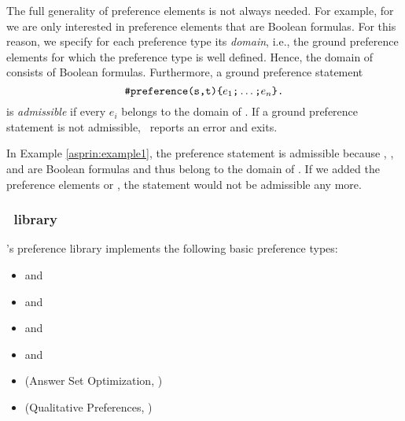 The full generality of preference elements is not always needed.
%
For example, for  we are only interested in preference elements that are Boolean formulas.
For this reason, we specify for each preference type its \emph{domain}, 
i.e., the ground preference elements for which the preference type is well defined.
Hence, the domain of  consists of Boolean formulas.
Furthermore, a ground preference statement
\[\texttt{\#preference(s,t)\{}e_1\texttt{;}\dots\texttt{;}e_n\texttt{\}.}\]
is \emph{admissible} if every ${e}_i$ belongs to the domain of .
If a ground preference statement is not admissible, \asprin\ reports an error and exits. 
\begin{example}
In Example \ref{asprin:example1}, the preference statement   
is admissible because , , and  are Boolean formulas
and thus belong to the domain of . 
If we added the preference elements  or , 
the statement would not be admissible any more.
\end{example}

\subsubsection{\asprin\ library}
\asprin's preference library implements the following basic preference types:
\begin{itemize}
	\item  {} and    
	\item  {} and    
	\item  {} and    
	\item  {} and    
	\item  {}   (Answer Set Optimization, \cite{brnitr03a})   
	\item  {} (Qualitative Preferences, \cite{rogima10a})  
\end{itemize}

